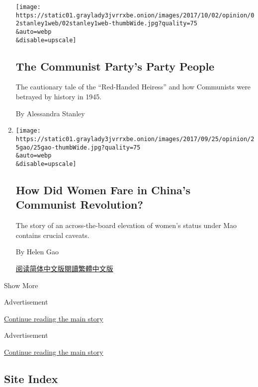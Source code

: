 \begin{enumerate}
  \texttt{[image: https://static01.graylady3jvrrxbe.onion/images/2017/10/02/opinion/02stanley1web/02stanley1web-thumbWide.jpg?quality=75\\\&auto=webp\\\&disable=upscale]}

  \hypertarget{the-communist-partys-party-people}{%
  \subsection{The Communist Party's Party
  People}\label{the-communist-partys-party-people}}

  The cautionary tale of the ``Red-Handed Heiress'' and how Communists
  were betrayed by history in 1945.

  By Alessandra Stanley
\item
  \href{/2017/09/25/opinion/women-china-communist-revolution.html}{}

  \texttt{[image: https://static01.graylady3jvrrxbe.onion/images/2017/09/25/opinion/25gao/25gao-thumbWide.jpg?quality=75\\\&auto=webp\\\&disable=upscale]}

  \hypertarget{how-did-women-fare-in-chinas-communist-revolution}{%
  \subsection{How Did Women Fare in China's Communist
  Revolution?}\label{how-did-women-fare-in-chinas-communist-revolution}}

  The story of an across-the-board elevation of women's status under Mao
  contains crucial caveats.

  By Helen Gao

  \href{https://cn.nytimes3xbfgragh.onion/opinion/20170926/women-china-communist-revolution/}{阅读简体中文版}\href{https://cn.nytimes3xbfgragh.onion/opinion/20170926/women-china-communist-revolution/zh-hant/}{閱讀繁體中文版}
\end{enumerate}

Show More

Advertisement

\protect\hyperlink{after-mid1}{Continue reading the main story}

Advertisement

\protect\hyperlink{after-mktg}{Continue reading the main story}

\hypertarget{site-index}{%
\subsection{Site Index}\label{site-index}}

